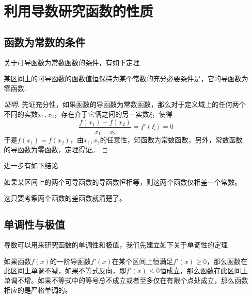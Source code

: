 
\section{利用导数研究函数的性质}
\label{sec:research-function-use-derivative}

\subsection{函数为常数的条件}
\label{sec:condition-for-constant-function}

关于可导函数为常数函数的条件，有如下定理

\begin{theorem}
  某区间上的可导函数的函数值恒保持为某个常数的充分必要条件是，它的导函数为零函数.
\end{theorem}

\begin{proof}[证明]
  先证充分性，如果函数的导函数为常数函数，那么对于定义域上的任何两个不同的实数$x_1,x_2$，存在介于它俩之间的另一实数$\xi$，使得
  \[ \frac{f(x_1)-f(x_2)}{x_1-x_2} = f'(\xi) = 0 \]
  于是$f(x_1)=f(x_2)$，由$x_1,x_2$的任意性，知函数为常数函数，另外，常数函数的导函数为零函数，定理得证。
\end{proof}

进一步有如下结论
\begin{inference}
  如果某区间上的两个可导函数的导函数恒相等，则这两个函数仅相差一个常数。
\end{inference}
这只要考察两个函数的差函数就清楚了。

\subsection{单调性与极值}
\label{sec:research-monotonicity-and-minmax-value}

导数可以用来研究函数的单调性和极值，我们先建立如下关于单调性的定理
\begin{theorem}
  如果函数$f(x)$的一阶导函数$f'(x)$在某个区间上恒满足$f'(x) \geqslant 0$，那么函数在此区间上单调不减，如果不等式反向，即$f'(x) \leqslant 0$恒成立，那么函数在此区间上单调不增。如果不等式中的等号总不成立或者至多仅在有限个点处成立，那么函数相应的是严格单调的。
\end{theorem}

